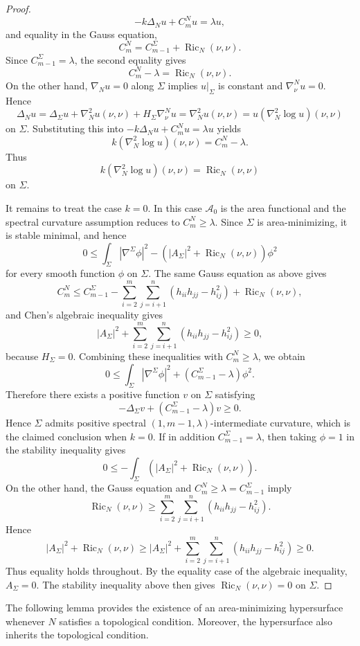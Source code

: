 \documentclass[11pt]{amsart}
\DeclareMathOperator{\Ric}{Ric}
\newcommand{\mA}{\mathcal{A}}
\theoremstyle{definition}
\theoremstyle{remark}
\numberwithin{equation}{section}
\begin{document}
\begin{proof}
\[
    -k\Delta_N u+C_m^Nu=\lambda u,
\]
and equality in the Gauss equation,
\[
    C_m^N=C_{m-1}^{\Sigma}+\Ric_N(\nu,\nu).
\]
Since $C_{m-1}^{\Sigma}=\lambda$, the second equality gives
\[
    C_m^N-\lambda=\Ric_N(\nu,\nu).
\]
On the other hand, $\nabla_Nu=0$ along $\Sigma$ implies
  $u|_{\Sigma}$ is constant and $\nabla_\nu^N u=0$. Hence
\[
    \Delta_Nu=\Delta_\Sigma u+\nabla_N^2u(\nu,\nu)+H_\Sigma\nabla_\nu^N u
    =\nabla_N^2u(\nu,\nu)
    =u(\nabla_N^2\log u)(\nu,\nu)
\]
on $\Sigma$. Substituting this into
  $-k\Delta_Nu+C_m^Nu=\lambda u$ yields
\[
    k(\nabla_N^2\log u)(\nu,\nu)=C_m^N-\lambda.
\]
Thus
\[
    k(\nabla_N^2\log u)(\nu,\nu)=\Ric_N(\nu,\nu)
\]
on $\Sigma$.

It remains to treat the case $k=0$. In this case $\mA_0$ is the area functional and the spectral
  curvature assumption reduces to $C_m^N\geq \lambda$. Since $\Sigma$ is area-minimizing, it is
  stable minimal, and hence
\[
    0\leq \int_\Sigma |\nabla^\Sigma\phi|^2
      -\left(|A_\Sigma|^2+\Ric_N(\nu,\nu)\right)\phi^2
\]
for every smooth function $\phi$ on $\Sigma$. The same Gauss equation as above gives
\[
    C_m^N\leq C_{m-1}^{\Sigma}
    -\sum_{i=2}^{m}\sum_{j=i+1}^{n}(h_{ii}h_{jj}-h_{ij}^2)+\Ric_N(\nu,\nu),
\]
and Chen's algebraic inequality gives
\[
    |A_\Sigma|^2+\sum_{i=2}^{m}\sum_{j=i+1}^{n}(h_{ii}h_{jj}-h_{ij}^2)\geq 0,
\]
because $H_\Sigma=0$. Combining these inequalities with $C_m^N\geq\lambda$, we obtain
\[
    0\leq \int_\Sigma |\nabla^\Sigma\phi|^2+(C_{m-1}^{\Sigma}-\lambda)\phi^2.
\]
Therefore there exists a positive function $v$ on $\Sigma$ satisfying
\[
    -\Delta_\Sigma v+(C_{m-1}^{\Sigma}-\lambda)v\geq 0.
\]
Hence $\Sigma$ admits positive spectral $(1,m-1,\lambda)$-intermediate curvature, which is the
  claimed conclusion when $k=0$.
If in addition $C_{m-1}^{\Sigma}=\lambda$, then taking $\phi=1$ in the stability inequality gives
\[
    0\leq -\int_\Sigma \left(|A_\Sigma|^2+\Ric_N(\nu,\nu)\right).
\]
On the other hand, the Gauss equation and $C_m^N\geq \lambda=C_{m-1}^\Sigma$ imply
\[
    \Ric_N(\nu,\nu)\geq
    \sum_{i=2}^{m}\sum_{j=i+1}^{n}(h_{ii}h_{jj}-h_{ij}^2).
\]
Hence
\[
    |A_\Sigma|^2+\Ric_N(\nu,\nu)\geq
    |A_\Sigma|^2+\sum_{i=2}^{m}\sum_{j=i+1}^{n}(h_{ii}h_{jj}-h_{ij}^2)\geq0.
\]
Thus equality holds throughout. By the equality case of the algebraic inequality, $A_\Sigma=0$.
The stability inequality above then gives $\Ric_N(\nu,\nu)=0$ on $\Sigma$.

\end{proof}

The following lemma provides the existence of an area-minimizing hypersurface whenever $N$ satisfies
  a topological condition. Moreover, the hypersurface also inherits the topological condition.
\end{document}
